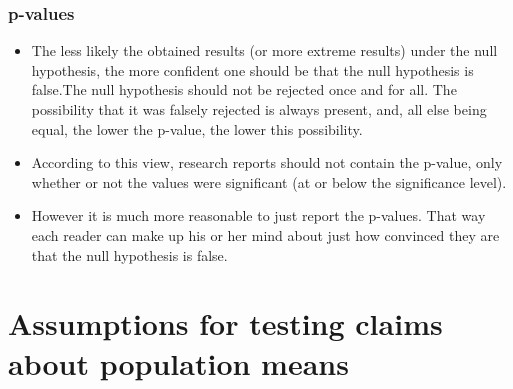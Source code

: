 ﻿\documentclass[a4]{beamer}
\begin{document}
\begin{frame}
\frametitle{p-values}
\begin{itemize}
\item The less likely the obtained results (or more extreme results) under the null hypothesis, the more confident one should be that the null hypothesis is false.The null hypothesis should not be rejected once and for all. The possibility that it was falsely rejected is always present, and, all else being equal, the lower the p-value, the lower this possibility.
\item According to this view, research reports should not contain the p-value, only whether or not the values were significant (at or below the significance level). 
\item 
However it is much more reasonable to just report the p-values. That way each reader can make up his or her mind about just how convinced they are that the null hypothesis is false.
\end{itemize}
\end{frame}

\section{Assumptions for testing claims about population means}


\end{document}
